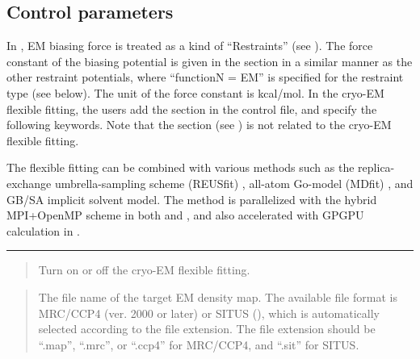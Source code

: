 \documentclass[a4paper,11pt,oneside,english]{sphinxmanual}
\begin{document}
\subsection{Control parameters}
\label{\detokenize{19_Experiments:control-parameters}}
In , EM biasing force is treated as a kind of “Restraints” (see {\hyperref[\detokenize{12_Restraints:restraints}]{}}).
The force constant of the biasing potential is given in the \sphinxstylestrong{{[}RESTRAINTS{]}} section
in a similar manner as the other restraint potentials,
where “functionN = EM” is specified for the restraint type (see below).
The unit of the force constant is kcal/mol.
In the cryo-EM flexible fitting, the users add the \sphinxstylestrong{{[}EXPERIMENTS{]}} section
in the control file, and specify the following keywords.
Note that the \sphinxstylestrong{{[}FITTING{]}} section (see {\hyperref[\detokenize{13_Fitting:fitting}]{}}) is not related
to the cryo-EM flexible fitting.

The flexible fitting can be combined with various methods such as the replica-exchange
umbrella-sampling scheme (REUSfit) ,
all-atom Go-model (MDfit) , and GB/SA implicit solvent model.
The method is parallelized with the hybrid MPI+OpenMP scheme
in both  and , and also accelerated with GPGPU calculation in  .


\bigskip\hrule\bigskip


 
\begin{quote}


Turn on or off the cryo-EM flexible fitting.
\end{quote}

 
\begin{quote}


The file name of the target EM density map.
The available file format is MRC/CCP4 (ver. 2000 or later) or SITUS (),
which is automatically selected according to the file extension.
The file extension should be “.map”, “.mrc”, or “.ccp4” for MRC/CCP4, and “.sit” for SITUS.
\end{quote}
\end{document}
